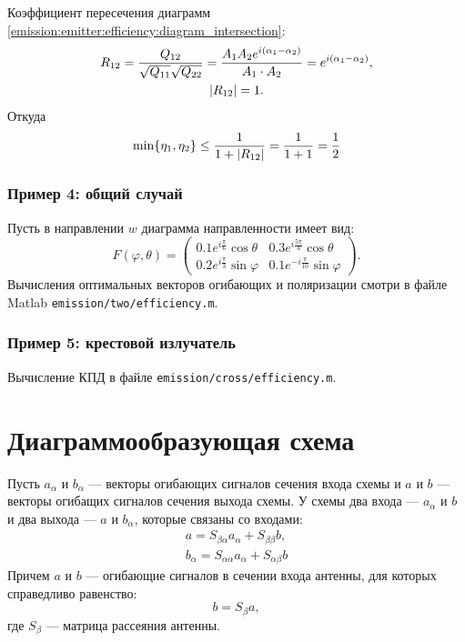 Коэффициент пересечения диаграмм \eqref{emission:emitter:efficiency:diagram_intersection}:
\begin{gather*}
    R_{12}
    = \frac{Q_{12}}{\sqrt{Q_{11}} \sqrt{Q_{22}}}
    = \frac{A_1 A_2 e^{i(\alpha_1 - \alpha_2)}}{A_1 \cdot A_2}
    = e^{i(\alpha_1 - \alpha_2)}, \\
    \left | R_{12} \right | = 1 .
\end{gather*}
Откуда
\[
    \min \{ \eta_1, \eta_2 \} \le \frac{1}{1 + \left | R_{12} \right |} = \frac{1}{1+1} = \frac{1}{2}
\]

\subsubsection{Пример 4: общий случай}

Пусть в направлении $w$ диаграмма направленности имеет вид:
\[
    F(\varphi, \theta)
    =
    \begin{pmatrix}
        0.1 e^{i \frac{\pi}{6}} \cos \theta  & 0.3 e^{i \frac{5 \pi}{4}} \cos \theta   \\
        0.2 e^{i \frac{\pi}{3}} \sin \varphi & 0.1 e^{- i \frac{\pi}{10}} \sin \varphi
    \end{pmatrix} .
\]
Вычисления оптимальных векторов огибающих и поляризации смотри в файле Matlab \texttt{emission/two/efficiency.m}.

\subsubsection{Пример 5: крестовой излучатель}

Вычисление КПД в файле \texttt{emission/cross/efficiency.m}.

\section{Диаграммообразующая схема}

Пусть $a_\alpha$ и $b_\alpha$ --- векторы огибающих сигналов сечения входа схемы и $a$ и $b$ --- векторы огибащих сигналов сечения выхода схемы. У схемы два входа ---
$a_\alpha$ и $b$ и два выхода --- $a$ и $b_\alpha$, которые связаны со входами:
\begin{gather}
    a        = S_{\beta \alpha} a_\alpha + S_{\beta \beta} b
    \label{emission:scheme:upper_output}, \\
    b_\alpha = S_{\alpha \alpha} a_\alpha + S_{\alpha \beta} b
    \label{emission:scheme:lower_output}
\end{gather}
Причем $a$ и $b$ --- огибающие сигналов в сечении входа антенны, для которых справедливо равенство:
\begin{equation}
    \label{emission:scheme:reflections}
    b = S_\beta a ,
\end{equation}
где $S_\beta$ --- матрица рассеяния антенны.


